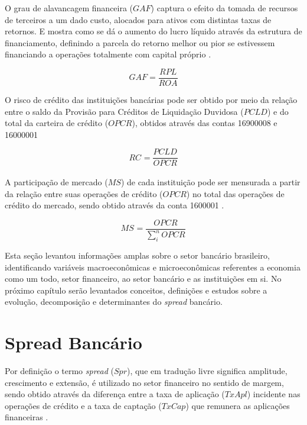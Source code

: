 \documentclass[
  12pt,
  12pt,
  openright,
  oneside,
  a4paper,
  chapter=TITLE,
  section=TITLE,
  subsection=TITLE,
  subsubsection=TITLE,
  portugues,
  sumario=tradicional]{abntex2}
\begin{document}
O grau de alavancagem financeira (\(GAF\)) captura o efeito da tomada de recursos de terceiros a um dado custo, alocados para ativos com distintas taxas de retornos. E mostra como se dá o aumento do lucro líquido através da estrutura de financiamento, definindo a parcela do retorno melhor ou pior se estivessem financiando a operações totalmente com capital próprio \cite{assaf:2020}.

\begin{equation}
GAF = \frac{RPL}{ROA}
\end{equation}

O risco de crédito das instituições bancárias pode ser obtido por meio da relação entre o saldo da Provisão para Créditos de Liquidação Duvidosa (\(PCLD\)) e do total da carteira de crédito (\(OPCR\)), obtidos através das contas 16900008 e 16000001 \cite{dantas:2012}

\begin{equation}
RC_{} = \frac{PCLD_{}}{OPCR_{}}
\end{equation}

A participação de mercado (\(MS\)) de cada instituição pode ser mensurada a partir da relação entre suas operações de crédito (\(OPCR\)) no total das operações de crédito do mercado, sendo obtido através da conta 1600001 \cite{dantas:2012}.

\begin{equation}
MS_{} = \frac{OPCR_{}}{\sum_{i}^{n}OPCR_{}} 
\end{equation}

Esta seção levantou informações amplas sobre o setor bancário brasileiro, identificando variáveis macroeconômicas e microeconômicas referentes a economia como um todo, setor financeiro, ao setor bancário e as instituições em si. No próximo capítulo serão levantados conceitos, definições e estudos sobre a evolução, decomposição e determinantes do \emph{spread} bancário.

\textual
\pagestyle{simple}
\parindent 1.50cm

\section{Spread Bancário}\label{sec:spread}

Por definição o termo \emph{spread} (\(Spr\)), que em tradução livre significa amplitude, crescimento e extensão, é utilizado no setor financeiro no sentido de margem, sendo obtido através da diferença entre a taxa de aplicação (\(TxApl\)) incidente nas operações de crédito e a taxa de captação (\(TxCap\)) que remunera as aplicações financeiras \cite{BCB:2000, BCB:1999}.
\end{document}
